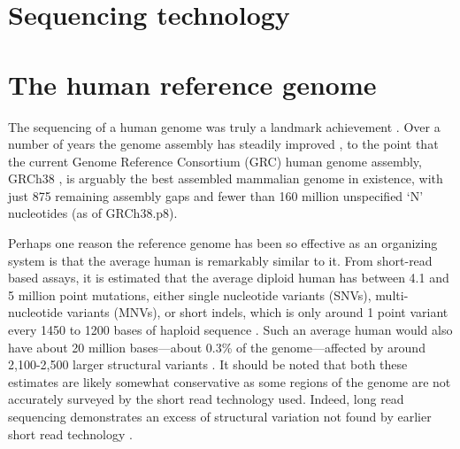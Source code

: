 \documentclass[11pt]{ucthesis}
\begin{document}
\section{Sequencing technology}

\section{The human reference genome}

The sequencing of a human genome was truly a landmark achievement \cite{lander2001initial}. Over a number of years the genome assembly has steadily improved \cite{international2004finishing,church2011modernizing}, to the point that the current Genome Reference Consortium (GRC) human genome assembly, GRCh38 \cite{schneider2016evaluation}, is arguably the best assembled mammalian genome in existence, with just 875 remaining assembly gaps and fewer than 160 million unspecified `N' nucleotides (as of GRCh38.p8). 



Perhaps one reason the reference genome has been so effective as an organizing system is that the average human is remarkably similar to it. From short-read based assays, it is estimated that the average diploid human has between 4.1 and 5 million point mutations, either single nucleotide variants (SNVs), multi-nucleotide variants (MNVs), or short indels, which is only around 1 point variant every 1450 to 1200 bases of haploid sequence \cite{10002015global}. Such an average human would also have about 20 million bases---about 0.3\% of the genome---affected by around 2,100-2,500 larger structural variants \cite{10002015global}. It should be noted that both these estimates are likely somewhat conservative as some regions of the genome are not accurately surveyed by the short read technology used. Indeed, long read sequencing demonstrates an excess of structural variation not found by earlier short read technology \cite{chaisson2015resolving,seo2016novo}.
\end{document}
